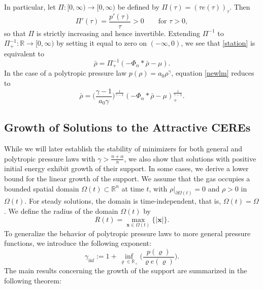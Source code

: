\documentclass[reqno,11pt]{amsart}
\numberwithin{equation}{section}
\newcommand{\R}{\mathbb{R}}
\theoremstyle{definition}
\begin{document}
In particular, let $\Pi:[0,\infty) \to [0,\infty)$ be defined 
by $\Pi(\tau) = (\tau e(\tau))_{\tau}$. Then 
$$
\Pi'(\tau) = \frac{p'(\tau)}{\tau} > 0\qquad \mbox{for $\tau > 0$}, 
$$
so that $\Pi$ is strictly increasing and hence invertible. 
Extending $\Pi^{-1}$ to $\Pi^{-1}_+:\mathbb{R} \to [0,\infty)$ by setting it equal 
to zero on $(-\infty, 0)$,
we see that \eqref{station} is equivalent to
\begin{equation}\label{newlm}
 \bar{\rho} = \Pi_+^{-1}(-\Phi_\alpha * \bar{\rho} - \mu).
\end{equation}
In the case of a polytropic pressure law $p(\rho) = a_0 \rho^\gamma$, 
equation \eqref{newlm} reduces to 
\begin{equation*}
\bar{\rho} = \Big ( \frac{\gamma - 1}{a_0 \gamma} \Big )^\frac{1}{\gamma - 1} 
(- \Phi_\alpha * \bar{\rho}- \mu)_+^\frac{1}{\gamma - 1}.
\end{equation*}


\subsection{Growth of Solutions to the Attractive CEREs}
While we will later establish the stability of minimizers for both general and polytropic pressure
laws with $\gamma > \frac{n + \alpha}{n}$, we also show that solutions with positive initial energy 
exhibit growth of their support. 
In some cases, we derive a lower bound for the linear growth of the support. 
We assume that the gas occupies a bounded spatial domain $\Omega(t)\subset\mathbb{\R}^n$ 
at time $t$, with $\rho|_{\partial\Omega(t)}=0$ and $\rho>0$ in $\Omega(t)$. 
For steady solutions, the domain is time-independent, that is, 
$\Omega(t)=\Omega$. We define the radius of the domain $\Omega(t)$ by
\begin{equation}\label{2.5a}
 R(t)=\max_{\boldsymbol{x}\in\Omega(t)}\{|\boldsymbol{x}|\}.
\end{equation}
To generalize the behavior of polytropic pressure laws to more general pressure functions, 
we introduce the following exponent:
 \begin{equation}\label{gammainf}
  \gamma_{\inf} := 1 + \inf_{\varrho \in \mathbb{R}_+} \Big( \frac{p(\varrho)}{\varrho e(\varrho)} \Big).
\end{equation}
The main results concerning the growth of the support are summarized in the following theorem:
\end{document}

